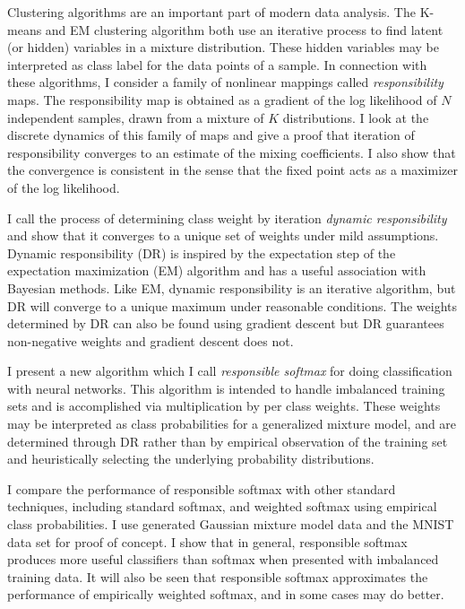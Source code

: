 

Clustering algorithms are an important part of modern data analysis.  The K-means and EM clustering algorithm both use an iterative process to find latent (or hidden) variables in a mixture distribution.  These hidden variables may be interpreted as class label for the data points of a sample.  In connection with these algorithms, I consider a family of nonlinear mappings called \textit{responsibility} maps. The responsibility map is obtained as a gradient of the log likelihood of $N$ independent samples, drawn from a mixture of $K$ distributions.  I look at the discrete dynamics of this family of maps and give a proof that iteration of responsibility converges to an estimate of the mixing coefficients.  I also show that the convergence is consistent in the sense that the fixed point acts as a maximizer of the log likelihood.

I call the process of determining class weight by iteration \textit{dynamic responsibility} and show that it converges to a unique set of weights under mild assumptions. Dynamic responsibility (DR) is inspired by the expectation step of the expectation maximization (EM) algorithm and has a useful association with Bayesian methods.  Like EM, dynamic responsibility is an iterative algorithm, but DR will converge to a unique maximum under reasonable conditions.  The weights determined by DR can also be found using gradient descent but DR guarantees non-negative weights and gradient descent does not.

I present a new algorithm which I call \textit{responsible softmax} for doing classification with neural networks.  This algorithm is intended to handle imbalanced training sets and is accomplished via multiplication by per class weights.  These weights may be interpreted as class probabilities for a generalized mixture model, and are determined through DR rather than by empirical observation of the training set and heuristically selecting the underlying probability distributions.

I compare the performance of responsible softmax with other standard techniques, including standard softmax, and weighted softmax using empirical class probabilities.  I use generated Gaussian mixture model data and the MNIST data set for proof of concept.  I show that in general, responsible softmax produces more useful classifiers than softmax when presented with imbalanced training data.  It will also be seen that responsible softmax approximates the performance of empirically weighted softmax, and in some cases may do better.
